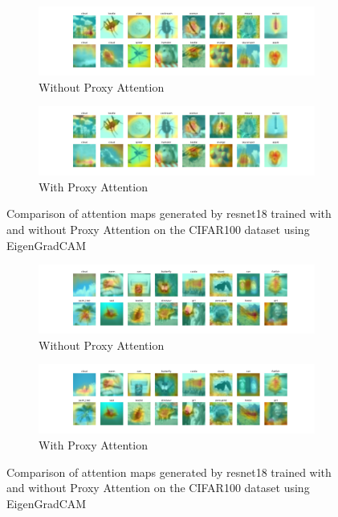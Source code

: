 \documentclass[a4paper,11pt,openright]{book}
\begin{document}
\begin{figure}[!htb]
    \centering
    \begin{subfigure}[b]{1\textwidth}
        \includegraphics[width=\textwidth]{images/cifar100_resnet18_noproxy_1.pdf}
        \caption{Without Proxy Attention}
    \end{subfigure}
    \hfill
    \begin{subfigure}[b]{1\textwidth}
        \includegraphics[width=\textwidth]{images/cifar100_resnet18_proxy_1.pdf}
        \caption{With Proxy Attention}
    \end{subfigure}
    \caption{Comparison of attention maps generated by resnet18 trained with and without Proxy Attention on the CIFAR100 dataset using EigenGradCAM}
\end{figure}


\begin{figure}[!htb]
    \centering
    \begin{subfigure}[b]{1\textwidth}
        \includegraphics[width=\textwidth]{images/cifar100_resnet18_noproxy_2.pdf}
        \caption{Without Proxy Attention}
    \end{subfigure}
    \hfill
    \begin{subfigure}[b]{1\textwidth}
        \includegraphics[width=\textwidth]{images/cifar100_resnet18_proxy_2.pdf}
        \caption{With Proxy Attention}
    \end{subfigure}
    \caption{Comparison of attention maps generated by resnet18 trained with and without Proxy Attention on the CIFAR100 dataset using EigenGradCAM}
\end{figure}
\end{document}
